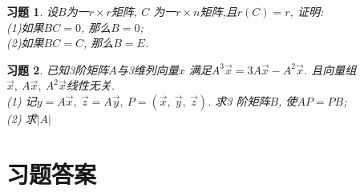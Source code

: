 \documentclass[a4paper]{book}
\newtheorem{ex}{习题}[chapter]
\begin{document}
\begin{ex}\label{4.28}
设$B$为一$r\times r$矩阵, $C$ 为一$r\times n$矩阵,且$r(C)=r$, 证明:\\
(1)如果$BC=0$, 那么$B=0$; \\
(2)如果$BC=C$, 那么$B=E$.
\end{ex}

\begin{ex}\label{4.29}
已知3阶矩阵$A$与3维列向量$x$ 满足$A^3 \vec{x}=3A\vec{x}-A^2\vec{x}$. 且向量组$\vec{x},\ A\vec{x},\ A^2\vec{x}$线性无关.\\
(1) 记$y=A\vec{x},\ \vec{z}=A\vec{y},\ P=(\vec{x},\ \vec{y},\ \vec{z})$. 求3 阶矩阵$B$, 使$AP=PB$;\\
(2) 求$|A|$
\end{ex}


\section{习题答案}
\end{document}
